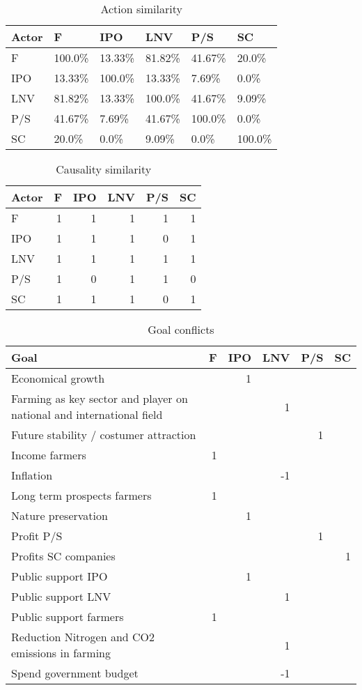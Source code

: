 \begin{table}
\caption{Action similarity}
\begin{tabular}{|l|l|l|l|l|l|}
\hline
Actor & F & IPO & LNV & P/S & SC \\
\hline
F & 100.0\% & 13.33\% & 81.82\% & 41.67\% & 20.0\% \\
IPO & 13.33\% & 100.0\% & 13.33\% & 7.69\% & 0.0\% \\
LNV & 81.82\% & 13.33\% & 100.0\% & 41.67\% & 9.09\% \\
P/S & 41.67\% & 7.69\% & 41.67\% & 100.0\% & 0.0\% \\
SC & 20.0\% & 0.0\% & 9.09\% & 0.0\% & 100.0\% \\
\hline
\end{tabular}
\end{table}

\begin{table}
\caption{Causality similarity}
\begin{tabular}{|l|r|r|r|r|r|}
\hline
Actor & F & IPO & LNV & P/S & SC \\
\hline
F & 1 & 1 & 1 & 1 & 1 \\
IPO & 1 & 1 & 1 & 0 & 1 \\
LNV & 1 & 1 & 1 & 1 & 1 \\
P/S & 1 & 0 & 1 & 1 & 0 \\
SC & 1 & 1 & 1 & 0 & 1 \\
\hline
\end{tabular}
\end{table}

\begin{table}
\caption{Goal conflicts}
\begin{tabular}{|l|r|r|r|r|r|}
\hline
Goal & F & IPO & LNV & P/S & SC \\
\hline
Economical growth &  & 1 &  &  &  \\
Farming as key sector and player on national and international field &  &  & 1 &  &  \\
Future stability / costumer attraction &  &  &  & 1 &  \\
Income farmers & 1 &  &  &  &  \\
Inflation &  &  & -1 &  &  \\
Long term prospects farmers & 1 &  &  &  &  \\
Nature preservation &  & 1 &  &  &  \\
Profit P/S &  &  &  & 1 &  \\
Profits SC companies &  &  &  &  & 1 \\
Public support IPO &  & 1 &  &  &  \\
Public support LNV &  &  & 1 &  &  \\
Public support farmers & 1 &  &  &  &  \\
Reduction Nitrogen and CO2 emissions in farming &  &  & 1 &  &  \\
Spend government budget &  &  & -1 &  &  \\
\hline
\end{tabular}
\end{table}

